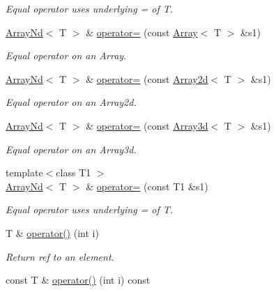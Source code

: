 \begin{DoxyCompactItemize}
\begin{DoxyCompactList}\small\item\em Equal operator uses underlying = of T. \end{DoxyCompactList}\item 
\mbox{\hyperlink{classADAT_1_1ArrayNd}{Array\+Nd}}$<$ T $>$ \& \mbox{\hyperlink{classADAT_1_1ArrayNd_a3290ebbe75b40ebde8f3506f2aea64a5}{operator=}} (const \mbox{\hyperlink{classXMLArray_1_1Array}{Array}}$<$ T $>$ \&s1)
\begin{DoxyCompactList}\small\item\em Equal operator on an Array. \end{DoxyCompactList}\item 
\mbox{\hyperlink{classADAT_1_1ArrayNd}{Array\+Nd}}$<$ T $>$ \& \mbox{\hyperlink{classADAT_1_1ArrayNd_a95293530c9643394ae8133f0203d342b}{operator=}} (const \mbox{\hyperlink{classXMLArray_1_1Array2d}{Array2d}}$<$ T $>$ \&s1)
\begin{DoxyCompactList}\small\item\em Equal operator on an Array2d. \end{DoxyCompactList}\item 
\mbox{\hyperlink{classADAT_1_1ArrayNd}{Array\+Nd}}$<$ T $>$ \& \mbox{\hyperlink{classADAT_1_1ArrayNd_aa02a148fb7073245d21688eaa40d820b}{operator=}} (const \mbox{\hyperlink{classXMLArray_1_1Array3d}{Array3d}}$<$ T $>$ \&s1)
\begin{DoxyCompactList}\small\item\em Equal operator on an Array3d. \end{DoxyCompactList}\item 
{\footnotesize template$<$class T1 $>$ }\\\mbox{\hyperlink{classADAT_1_1ArrayNd}{Array\+Nd}}$<$ T $>$ \& \mbox{\hyperlink{classADAT_1_1ArrayNd_a4b2d8a768beccefe12844f27c50b058b}{operator=}} (const T1 \&s1)
\begin{DoxyCompactList}\small\item\em Equal operator uses underlying = of T. \end{DoxyCompactList}\item 
T \& \mbox{\hyperlink{classADAT_1_1ArrayNd_a927bb95e9323c4f74e0721ee867bcb64}{operator()}} (int i)
\begin{DoxyCompactList}\small\item\em Return ref to an element. \end{DoxyCompactList}\item 
const T \& \mbox{\hyperlink{classADAT_1_1ArrayNd_a0b16b5d4f7eed2684623a9c1dbcfeebe}{operator()}} (int i) const

\end{DoxyCompactItemize}
